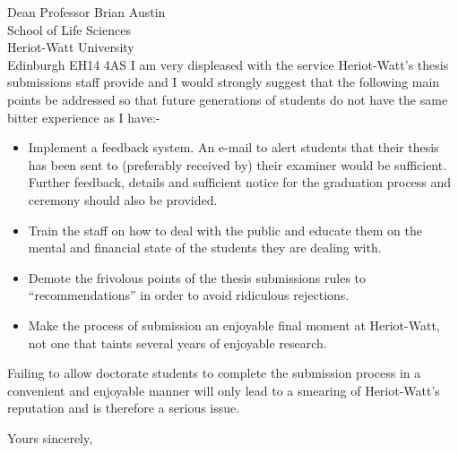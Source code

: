 \documentclass[10pt]{letter}
\begin{document}
\begin{letter}{Dean Professor Brian Austin\\
School of Life Sciences\\
Heriot-Watt University\\
Edinburgh EH14 4AS}
I am very displeased with the service Heriot-Watt's thesis submissions staff
provide and I would strongly suggest that the following main points be addressed
so that future generations of students do not have the same bitter experience as
I have:-
\begin{itemize}
\item Implement a feedback system. An e-mail to alert students that their thesis
  has been sent to (preferably received by) their examiner would be sufficient.
  Further feedback, details and sufficient notice for the graduation process and
  ceremony should also be provided.
\item Train the staff on how to deal with the public and educate them on the
  mental and financial state of the students they are dealing with.
\item Demote the frivolous points of the thesis submissions rules to
  ``recommendations'' in order to avoid ridiculous rejections.
\item Make the process of submission an enjoyable final moment at Heriot-Watt,
  not one that taints several years of enjoyable research.
\end{itemize}

Failing to allow doctorate students to complete the submission process in a
convenient and enjoyable manner will only lead to a smearing of Heriot-Watt's
reputation and is therefore a serious issue.

\closing{Yours sincerely,}

\end{letter}
\end{document}
